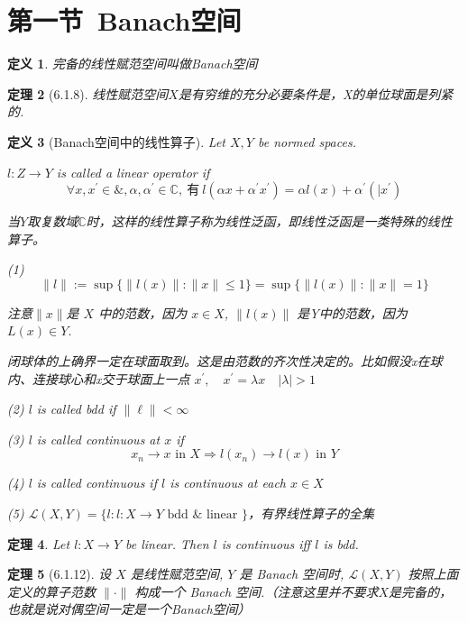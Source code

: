 \documentclass[10pt,openany]{book}
\theoremstyle{thmstyle} %
\newtheorem{theorem}{定理}[chapter]
\theoremstyle{defstyle} %
\newtheorem{definition}[theorem]{定义}
\theoremstyle{prostyle} %
\begin{document}
\section{第一节~Banach空间}


\begin{definition}
完备的线性赋范空间叫做Banach空间
\end{definition}

\begin{theorem}[6.1.8]
线性赋范空间$X$是有穷维的充分必要条件是，X的单位球面是列紧的.
\end{theorem}

\begin{definition}[Banach空间中的线性算子]
Let $X,Y$ be normed spaces.

$l: Z \rightarrow Y$ is called a linear operator if
$$
\forall x, x^{\prime} \in \&, \alpha, \alpha^{\prime} \in \mathbb{C},~ \text{有} ~ l\left(\alpha x+\alpha^{\prime} x^{\prime}\right)=\alpha l(x)+\alpha^{\prime}\left(\mid x^{\prime}\right)
$$

当$Y$取复数域$\mathbb{C}$时，这样的线性算子称为线性泛函，即线性泛函是一类特殊的线性算子。

(1) 
$$
\|l\|:=\sup \{\|l(x)\|:\|x\| \leqslant 1\} =\sup \{\|l(x)\|:\|x\|=1\}
$$

注意$\|x\|$是 $X$ 中的范数，因为 $x \in X$, $\|l(x)\|$ 是Y中的范数，因为 $L(x) \in Y$.

闭球体的上确界一定在球面取到。这是由范数的齐次性决定的。比如假没x在球内、连接球心和x交于球面上一点 $x^{\prime}, \quad x^{\prime}=\lambda x \quad|\lambda|>1$

(2) $ l$ is called bdd if $\|\ell\|<\infty$

(3) $l$ is called continuous at $x$ if
$$
x_n \rightarrow x \text { in } X \Rightarrow  l\left(x_n\right) \rightarrow l(x) \text { in } Y
$$

(4) $l$ is called continuous if $l$ is continuous at each $x \in X$

(5) $\mathcal{L}(X, Y)=\{l: l: X \rightarrow Y \text { bdd } \& \text { linear }\} $，有界线性算子的全集
\end{definition}

\begin{theorem}
Let $l: X \rightarrow Y$ be linear. Then $l$ is continuous iff $l$ is bdd.
\end{theorem}


\begin{theorem}[6.1.12]
设 $X$ 是线性赋范空间, $Y$ 是 Banach 空间时, $\mathcal{L}(X, Y)$ 按照上面定义的算子范数 $\|\cdot\|$ 构成一个 Banach 空间.（注意这里并不要求$X$是完备的，也就是说对偶空间一定是一个Banach空间）
\end{theorem}
\end{document}
